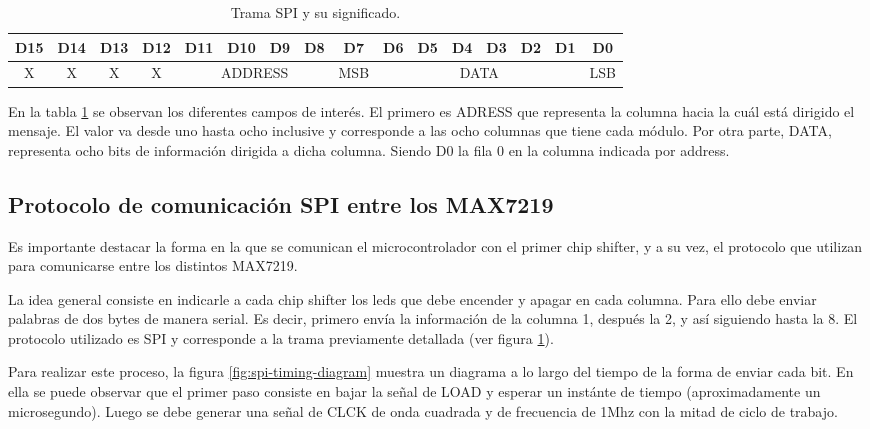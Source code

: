     \begin{table}[ht]
        \centering
        \caption{Trama SPI y su significado.}
        \label{table:trama-spi}
        \begin{adjustbox}{max width=\textwidth}
        \begin{tabular}{|c|c|c|c|c|c|c|c|c|c|c|c|c|c|c|c|}
        \hline
        D15 & D14 & D13 & D12 & D11   & D10   & D9   & D8   & D7 & D6 & D5 & D4 & D3 & D2 & D1 & D0 \\ \hline
        X   & X   & X   & X   & \multicolumn{4}{c|}{ADDRESS} & \multicolumn{1}{c}{ MSB } & \multicolumn{6}{c}{ DATA } & \multicolumn{1}{c|}{ LSB } \\ \hline
        \end{tabular}
        \end{adjustbox}
    \end{table}

    En la tabla \ref{table:trama-spi} se observan los diferentes campos de interés. El primero es ADRESS que representa la columna hacia la cuál está dirigido el mensaje. El valor va desde uno hasta ocho inclusive y corresponde a las ocho columnas que tiene cada módulo. Por otra parte, DATA, representa ocho bits de información dirigida a dicha columna. Siendo D0 la fila 0 en la columna indicada por address.


    \subsection{Protocolo de comunicación SPI entre los MAX7219} \label{sec:comunicacion}
    Es importante destacar la forma en la que se comunican el microcontrolador con el primer chip shifter, y a su vez, el protocolo que utilizan para comunicarse entre los distintos MAX7219.

    La idea general consiste en indicarle a cada chip shifter los leds que debe encender y apagar en cada columna. Para ello debe enviar palabras de dos bytes de manera serial. Es decir, primero envía la información de la columna 1, después la 2, y así siguiendo hasta la 8. El protocolo utilizado es SPI y corresponde a la trama previamente detallada (ver figura \ref{table:trama-spi}).

    Para realizar este proceso, la figura \ref{fig:spi-timing-diagram} muestra un diagrama a lo largo del tiempo de la forma de enviar cada bit. En ella se puede observar que el primer paso consiste en bajar la señal de LOAD y esperar un instánte de tiempo (aproximadamente un microsegundo). Luego se debe generar una señal de CLCK de onda cuadrada y de frecuencia de 1Mhz con la mitad de ciclo de trabajo.

